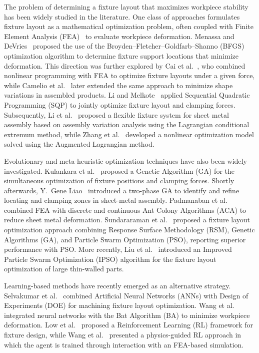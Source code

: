 \label{sec:related_work}

The problem of determining a fixture layout that maximizes workpiece stability has been widely studied in the literature. One class of approaches formulates fixture layout as a mathematical optimization problem, often coupled with Finite Element Analysis (FEA)~\cite{bhavikatti2005finite} to evaluate workpiece deformation. Menassa and DeVries~\cite{menassa1991optimization} proposed the use of the Broyden--Fletcher--Goldfarb--Shanno (BFGS) optimization algorithm to determine fixture support locations that minimize deformation. This direction was further explored by Cai et al.~\cite{cai1996deformable}, who combined nonlinear programming with FEA to optimize fixture layouts under a given force, while Camelio et al.~\cite{camelio2004impact} later extended the same approach to minimize shape variations in assembled products. Li and Melkote~\cite{li2001optimal} applied Sequential Quadratic Programming (SQP) to jointly optimize fixture layout and clamping forces. Subsequently, Li et al.~\cite{li2010variation} proposed a flexible fixture system for sheet metal assembly based on assembly variation analysis using the Lagrangian conditional extremum method, while Zhang et al.~\cite{zhang2010fixture} developed a nonlinear optimization model solved using the Augmented Lagrangian method.

Evolutionary and meta-heuristic optimization techniques have also been widely investigated. Kulankara et al.~\cite{kulankara2002iterative} proposed a Genetic Algorithm (GA) for the simultaneous optimization of fixture positions and clamping forces. Shortly afterwards, Y.~Gene Liao~\cite{liao2003genetic} introduced a two-phase GA to identify and refine locating and clamping zones in sheet-metal assembly. Padmanaban et al.~\cite{padmanaban2009machining} combined FEA with discrete and continuous Ant Colony Algorithms (ACA) to reduce sheet metal deformation. Sundararaman et al.~\cite{sundararaman2016optimization} proposed a fixture layout optimization approach combining Response Surface Methodology (RSM), Genetic Algorithms (GA), and Particle Swarm Optimization (PSO), reporting superior performance with PSO. More recently, Liu et al.~\cite{liu2024fixture} introduced an Improved Particle Swarm Optimization (IPSO) algorithm for the fixture layout optimization of large thin-walled parts.

Learning-based methods have recently emerged as an alternative strategy. Selvakumar et al.~\cite{selvakumar2013design} combined Artificial Neural Networks (ANNs) with Design of Experiments (DOE) for machining fixture layout optimization. Wang et al.~\cite{wang2016optimal} integrated neural networks with the Bat Algorithm (BA) to minimize workpiece deformation. Low et al.~\cite{low2020study} proposed a Reinforcement Learning (RL) framework for fixture design, while Wang et al.~\cite{wang2025smartfixture} presented a physics-guided RL approach in which the agent is trained through interaction with an FEA-based simulation.


